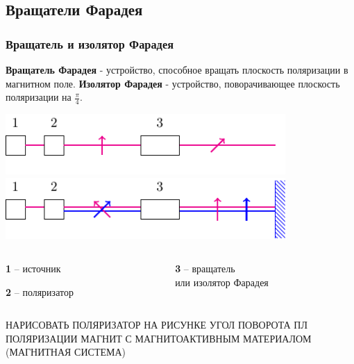 \documentclass[10pt,pdf,hyperref={unicode}, dvipsnames, handout]{beamer}
\begin{document}
\begin{frame}[t]
	\subsection{Вращатели Фарадея}
	\frametitle{Вращатель и изолятор Фарадея}
	\textbf{Вращатель Фарадея} - устройство, способное вращать плоскость поляризации в магнитном поле. \textbf{Изолятор Фарадея} - устройство, поворачивающее плоскость поляризации на $\frac{\pi}{4}$. 
	\begin{center}
		\includegraphics[width=0.8\textwidth]{img/rot}\\
		\includegraphics[width=0.8\textwidth]{img/zerc}
	\end{center}
	\begin{columns}
		\hspace{2.5cm}
		\begin{column}{0.3\textwidth}
			
			\textbf{1} -- источник
			
			\textbf{2} -- поляризатор
			
		\end{column}
		\hspace{1.6cm}
		\begin{column}{0.7\textwidth}
			
			\textbf{3} -- вращатель\\
			или изолятор Фарадея
		\end{column}
	\end{columns}
	НАРИСОВАТЬ ПОЛЯРИЗАТОР НА РИСУНКЕ УГОЛ ПОВОРОТА ПЛ ПОЛЯРИЗАЦИИ
	МАГНИТ С МАГНИТОАКТИВНЫМ МАТЕРИАЛОМ (МАГНИТНАЯ СИСТЕМА)
	
	
	
\end{frame}
\end{document}
